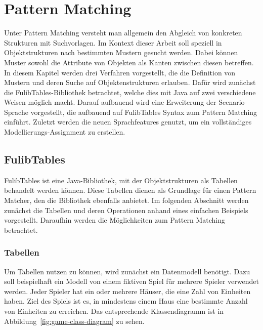 \chapter{Pattern Matching}\label{ch:pattern-matching}

Unter Pattern Matching versteht man allgemein den Abgleich von konkreten Strukturen mit Suchvorlagen.
Im Kontext dieser Arbeit soll speziell in Objektstrukturen nach bestimmten Mustern gesucht werden.
Dabei können Muster sowohl die Attribute von Objekten als Kanten zwischen diesen betreffen.
In diesem Kapitel werden drei Verfahren vorgestellt, die die Definition von Mustern und deren Suche auf Objektenstrukturen erlauben.
Dafür wird zunächst die FulibTables\cite{fulibTables}-Bibliothek betrachtet, welche dies mit Java auf zwei verschiedene Weisen möglich macht.
Darauf aufbauend wird eine Erweiterung der Scenario-Sprache vorgestellt, die aufbauend auf FulibTables Syntax zum Pattern Matching einführt.
Zuletzt werden die neuen Sprachfeatures genutzt, um ein vollständiges Modellierungs-Assignment zu erstellen.

\section{FulibTables}\label{sec:fulib-tables}

FulibTables\cite{fulibTables} ist eine Java-Bibliothek, mit der Objektstrukturen als Tabellen behandelt werden können.
Diese Tabellen dienen als Grundlage für einen Pattern Matcher, den die Bibliothek ebenfalls anbietet.
Im folgenden Abschnitt werden zunächst die Tabellen und deren Operationen anhand eines einfachen Beispiels vorgestellt.
Daraufhin werden die Möglichkeiten zum Pattern Matching betrachtet.

\subsection{Tabellen}\label{subsec:tables}

Um Tabellen nutzen zu können, wird zunächst ein Datenmodell benötigt.
Dazu soll beispielhaft ein Modell von einem fiktiven Spiel für mehrere Spieler verwendet werden.
Jeder Spieler hat ein oder mehrere Häuser, die eine Zahl von Einheiten haben.
Ziel des Spiels ist es, in mindestens einem Haus eine bestimmte Anzahl von Einheiten zu erreichen.
Das entsprechende Klassendiagramm ist in Abbildung~\ref{fig:game-class-diagram} zu sehen.

